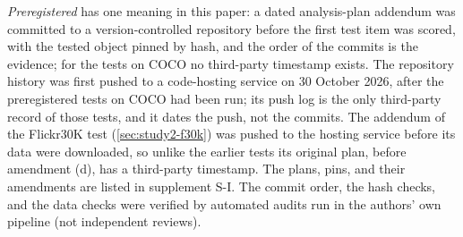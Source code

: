 \emph{Preregistered} has one meaning in this paper: a dated analysis-plan addendum was committed to a version-controlled repository
before the first test item was scored, with the tested object pinned by hash, and the order of the commits is the evidence; for the
tests on COCO no third-party timestamp exists.
The repository history was first pushed to a code-hosting service on 30 October 2026, after the preregistered tests on COCO had been run; its push log is the only third-party record of those tests, and it dates the push, not the commits.
The addendum of the Flickr30K test (\cref{sec:study2-f30k}) was pushed to the hosting service before its data were downloaded, so unlike the earlier tests its original plan, before amendment (d), has a third-party timestamp.
The plans, pins, and their amendments are listed in supplement S-I.
The commit order, the hash checks, and the data checks were verified by automated audits run in the authors' own pipeline (not
independent reviews).
